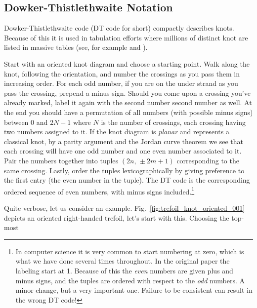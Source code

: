     \subsection{Dowker-Thistlethwaite Notation}
        Dowker-Thistlethwaite code (DT code for short) compactly describes
        knots. Because of this it is used in tabulation efforts where millions
        of distinct knot are listed in massive tables
        (see, for example \cite{Burton2020TheN3} and \cite{regina}).
        \par\hfill\par
        Start with an oriented knot diagram and choose a starting point.
        Walk along the knot, following the orientation, and number the
        crossings as you pass them in increasing order. For each odd number,
        if you are on the under strand as you pass the crossing,
        prepend a minus sign. Should you come upon a crossing you've already
        marked, label it again with the second number second number as well.
        At the end you should have a permutation of all numbers (with possible
        minus signs) between $0$ and $2N-1$ where $N$ is the number of
        crossings, each crossing having two numbers assigned to it. If the knot
        diagram is \textit{planar} and represents a classical knot, by a
        parity argument and the Jordan curve theorem we see that each crossing
        will have one odd number and one even number associated to it. Pair
        the numbers together into tuples $(2n,\,\pm{2m+1})$ corresponding to the
        same crossing. Lastly, order the tuples lexicographically by giving
        preference to the first entry (the even number in the tuple).
        The DT code is the corresponding ordered sequence of even numbers,
        with minus signs included.\footnote{%
            In computer science it is very common to start numbering at zero,
            which is what we have done several times throughout. In the
            original paper the labeling start at 1. Because of this the
            \textit{even} numbers are given plus and minus signs, and the
            tuples are ordered with respect to the \textit{odd} numbers. A
            minor change, but a very important one. Failure to be consistent
            can result in the wrong DT code!
        }
        \par\hfill\par
        Quite verbose, let us consider an example.
        Fig.~\ref{fig:trefoil_knot_oriented_001} depicts an oriented
        right-handed trefoil, let's start with this. Choosing the top-most
